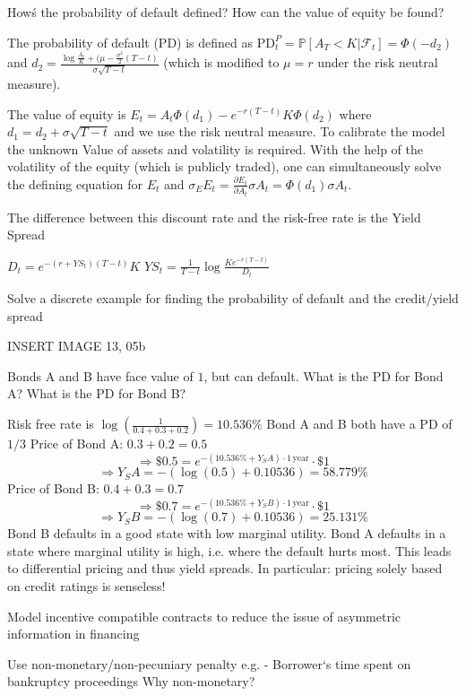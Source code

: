 How\'s the probability of default defined? 
How can the value of equity be found?

The probability of default (PD) is defined as
\( \text{PD}^P_t = \mathbb{P}[A_T < K|\mathcal{F}_t] = \Phi(-d_2) \)
and \( d_2 = \frac{\log{\frac{A_t}{K}} + (\mu - \frac{\sigma^2}{2}(T - t)}{\sigma\sqrt{T - t}} \)
(which is modified to \( \mu = r \) under the risk neutral measure). 

The value of equity is 
\( E_t = A_t \Phi(d_1) - e^{-r(T-t)}K\Phi(d_2) \)
where \( d_1 = d_2 + \sigma\sqrt{T - t} \) and we use the risk neutral measure.
To calibrate the model the unknown Value of assets and volatility is required.
With the help of the volatility of the equity (which is publicly traded),
one can simultaneously solve the defining equation for \( E_t \) and
\( \sigma_E E_t = \frac{\partial E_t}{\partial A_t}\sigma A_t = \Phi(d_1)\sigma A_t \).

The difference between this discount rate and the risk-free rate
is the Yield Spread

\( D_t = e^{-(r + YS_t)(T - t)}K \)
\( YS_t = \frac{1}{T - t}\log{\frac{K e^{-r(T-t)}}{D_t}} \)


Solve a discrete example for finding the probability of default 
and the credit/yield spread


INSERT IMAGE 13, 05b

Bonds A and B have face value of \( 1 \), but can default. What is the PD
for Bond A? What is the PD for Bond B?

Risk free rate is \(\log \left( \frac{1}{0.4 + 0.3 + 0.2} \right) = 10.536\%\)
Bond A and B both have a PD of \(1/3\)
Price of Bond A: \(0.3 + 0.2 = 0.5\)
\[\Rightarrow \$0.5 = e^{-(10.536\% + Y_SA) \cdot 1 \, \text{year}} \cdot \$1\]
\[\Rightarrow Y_SA = -( \log(0.5) + 0.10536) = 58.779\%\]
Price of Bond B: \(0.4 + 0.3 = 0.7\)
\[\Rightarrow \$0.7 = e^{-(10.536\% + Y_SB) \cdot 1 \, \text{year}} \cdot \$1\]
\[\Rightarrow Y_SB = -( \log(0.7) + 0.10536) = 25.131\%\]
Bond B defaults in a good state with low marginal utility. 
Bond A defaults in a state where marginal utility is high, i.e. where the default hurts most. 
This leads to differential pricing and thus yield spreads.
In particular: pricing solely based on credit ratings is senseless!



Model incentive compatible contracts to reduce the issue
of asymmetric information in financing

Use non-monetary/non-pecuniary penalty
e.g. 
- Borrower‘s time spent on bankruptcy proceedings
Why non-monetary?

